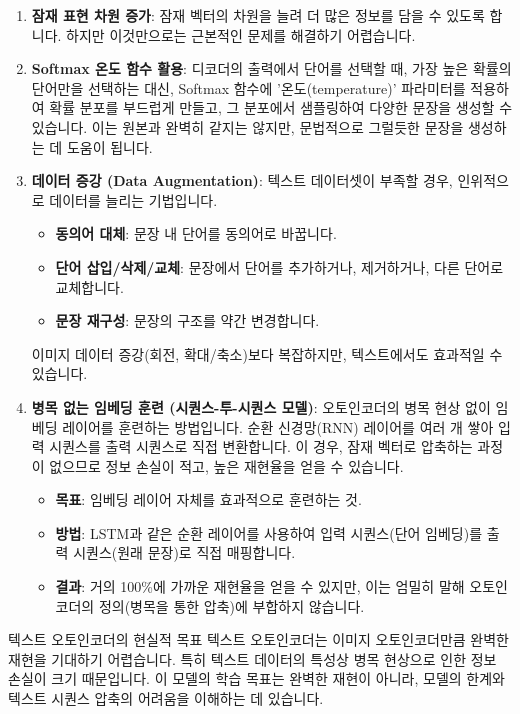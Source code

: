 \documentclass[11pt,a4paper]{article}
\begin{document}
\begin{enumerate}
    \item \textbf{잠재 표현 차원 증가}: 잠재 벡터의 차원을 늘려 더 많은 정보를 담을 수 있도록 합니다. 하지만 이것만으로는 근본적인 문제를 해결하기 어렵습니다.
    \item \textbf{Softmax 온도 함수 활용}: 디코더의 출력에서 단어를 선택할 때, 가장 높은 확률의 단어만을 선택하는 대신, Softmax 함수에 '온도(temperature)' 파라미터를 적용하여 확률 분포를 부드럽게 만들고, 그 분포에서 샘플링하여 다양한 문장을 생성할 수 있습니다. 이는 원본과 완벽히 같지는 않지만, 문법적으로 그럴듯한 문장을 생성하는 데 도움이 됩니다.
    \item \textbf{데이터 증강 (Data Augmentation)}: 텍스트 데이터셋이 부족할 경우, 인위적으로 데이터를 늘리는 기법입니다.
    \begin{itemize}
        \item \textbf{동의어 대체}: 문장 내 단어를 동의어로 바꿉니다.
        \item \textbf{단어 삽입/삭제/교체}: 문장에서 단어를 추가하거나, 제거하거나, 다른 단어로 교체합니다.
        \item \textbf{문장 재구성}: 문장의 구조를 약간 변경합니다.
    \end{itemize}
    이미지 데이터 증강(회전, 확대/축소)보다 복잡하지만, 텍스트에서도 효과적일 수 있습니다.
    \item \textbf{병목 없는 임베딩 훈련 (시퀀스-투-시퀀스 모델)}: 오토인코더의 병목 현상 없이 임베딩 레이어를 훈련하는 방법입니다. 순환 신경망(RNN) 레이어를 여러 개 쌓아 입력 시퀀스를 출력 시퀀스로 직접 변환합니다. 이 경우, 잠재 벡터로 압축하는 과정이 없으므로 정보 손실이 적고, 높은 재현율을 얻을 수 있습니다.
    \begin{itemize}
        \item \textbf{목표}: 임베딩 레이어 자체를 효과적으로 훈련하는 것.
        \item \textbf{방법}: LSTM과 같은 순환 레이어를 사용하여 입력 시퀀스(단어 임베딩)를 출력 시퀀스(원래 문장)로 직접 매핑합니다.
        \item \textbf{결과}: 거의 100\%에 가까운 재현율을 얻을 수 있지만, 이는 엄밀히 말해 오토인코더의 정의(병목을 통한 압축)에 부합하지 않습니다.
    \end{itemize}
\end{enumerate}

\begin{keytakeaway}{텍스트 오토인코더의 현실적 목표}
텍스트 오토인코더는 이미지 오토인코더만큼 완벽한 재현을 기대하기 어렵습니다. 특히 텍스트 데이터의 특성상 병목 현상으로 인한 정보 손실이 크기 때문입니다. 이 모델의 학습 목표는 완벽한 재현이 아니라, 모델의 한계와 텍스트 시퀀스 압축의 어려움을 이해하는 데 있습니다.
\end{keytakeaway}
\end{document}
